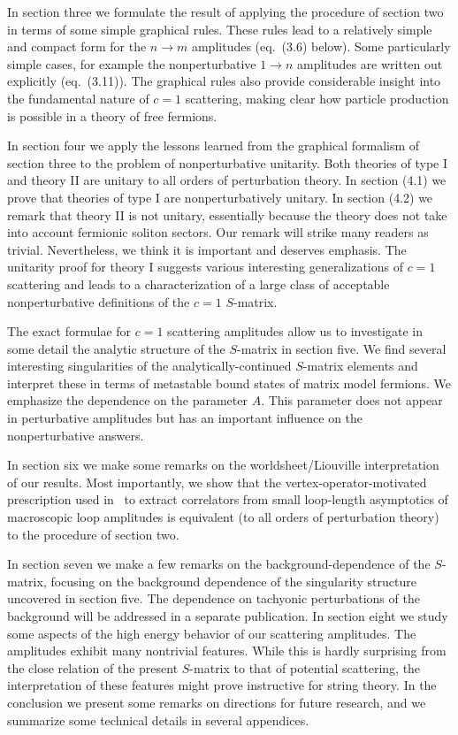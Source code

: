 In section three we formulate the result of applying the 
procedure of section two in terms of some simple 
graphical rules. These rules lead to a relatively 
simple and compact form for the $n\to m$ amplitudes
(eq.~(3.6) below). Some particularly simple cases, for 
example the nonperturbative $1\to n$ amplitudes are 
written out explicitly (eq.~(3.11)). The graphical rules also provide 
considerable insight into the fundamental nature of 
$c=1$ scattering, making clear how particle production is
possible in a theory of free fermions. 
 
In section four we apply the lessons learned from the 
graphical formalism of section three to the problem of 
nonperturbative unitarity. Both theories of type I and 
theory II are unitary to all orders of perturbation 
theory. In section (4.1) we prove that theories of type  I are
nonperturbatively unitary. In section (4.2) we remark that 
theory II is not unitary, essentially because the theory 
does not take into account fermionic soliton sectors. 
Our remark will strike many readers as trivial.
Nevertheless, we think it is important and deserves emphasis.
The unitarity proof for theory I suggests various interesting 
generalizations of $c=1$ scattering and leads to a characterization 
of a large class of acceptable
nonperturbative definitions of the $c=1$ $S$-matrix.
 
The exact formulae for $c=1$ scattering amplitudes allow us to investigate
in some detail the analytic structure of the $S$-matrix in section 
five. We find several interesting singularities of the analytically-continued 
$S$-matrix elements and interpret these in terms of metastable
bound states of matrix model fermions. We emphasize the dependence on 
the parameter $A$. This parameter does not appear in perturbative 
amplitudes but has an important influence on the nonperturbative answers.
 
In section six we make some remarks on the worldsheet/Liouville 
interpretation of our results. Most importantly, we show that 
the vertex-operator-motivated
prescription used in \moore\ to extract correlators from 
small loop-length asymptotics of macroscopic loop amplitudes
is equivalent (to all orders of 
perturbation theory) to the procedure of section two.  
 
 
In section seven we make a few remarks on the background-dependence
of the $S$-matrix, focusing on the background dependence of the 
singularity structure uncovered in section five. The dependence on
tachyonic perturbations of the background will be addressed in a 
separate publication. In section eight we study some aspects of 
the high energy behavior of our scattering amplitudes. The amplitudes
exhibit many nontrivial features. While this is hardly surprising from 
the close relation of the present $S$-matrix to that of potential 
scattering, the interpretation of these features might prove instructive
for string theory. In the conclusion we present some remarks on 
directions for future research, and we summarize some technical details 
in several appendices.
 
